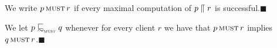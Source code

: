 










\begin{definition}%
  \label{def:must-extensional}
  We write $p \operatorname{\textsc{must}} r $ if every maximal
  computation of $p \mathrel{\llceil} r$ is successful.\hfill$\blacksquare$
\end{definition}



\begin{definition}[\mustpreorder]%
  \label{def:testleq}
  \label{def:testleqS}
We let $ \server \testleqS \serverB$ whenever for every
client $r$ we have that
$p \operatorname{\textsc{must}} r$ implies $q \operatorname{\textsc{must}} r$.\hfill$\blacksquare$
\end{definition}

